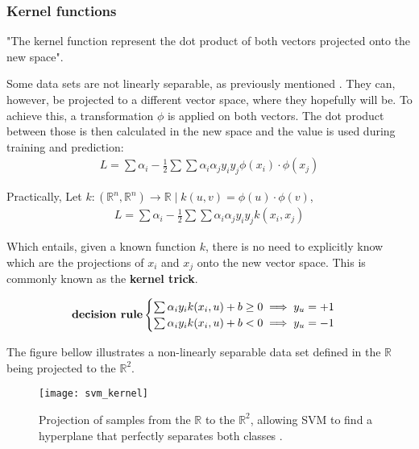 \subsubsection{Kernel functions}

"The kernel function represent the dot product of both vectors projected onto the new space". \cite{mitsvm}

Some data sets are not linearly separable, as previously mentioned	. They can, however, be projected to a different vector space, where they hopefully will be. To achieve this, a transformation $\phi$ is applied on both vectors. The dot product between those is then calculated in the new space and the value is used during training and prediction:
\begin{gather*}
L = \sum\alpha_i -\frac{1}{2}\sum\sum\alpha_i\alpha_j y_i y_j \phi(x_i) \cdot \phi(x_j)
\end{gather*}

\begin{remark}
	Practically, Let $k: (\mathbb{R}^n, \mathbb{R}^n) \rightarrow \mathbb{R} \mid k(u, v) = \phi(u) \cdot \phi(v)$,
	\begin{gather*}
	L = \sum\alpha_i -\frac{1}{2}\sum\sum\alpha_i\alpha_j y_i y_j k(x_i, x_j)
	\end{gather*}

	Which entails, given a known function $k$, there is no need to explicitly know which are the projections of $x_i$ and $x_j$ onto the new vector space. This is commonly known as the \textbf{kernel trick}.
\end{remark}

$$\text{\textbf{decision rule}} \begin{cases}
\sum\alpha_i y_i k(x_i, u) +b \geq 0 \implies y_u=+1\\
\sum\alpha_i y_i k(x_i, u) +b < 0 \implies y_u=-1\\
\end{cases}$$

The figure bellow illustrates a non-linearly separable data set defined in the $\mathbb{R}$ being projected to the $\mathbb{R}^2$.

\begin{figure}[H]
	\centering
	\captionsetup{justification=centering}

	\texttt{[image: svm\_kernel]}
	\caption{Projection of samples from the $\mathbb{R}$ to the $\mathbb{R}^2$, allowing SVM to find a hyperplane that perfectly separates both classes \cite{svmkernels}.}
	\label{fig:svmkernel}
\end{figure}

